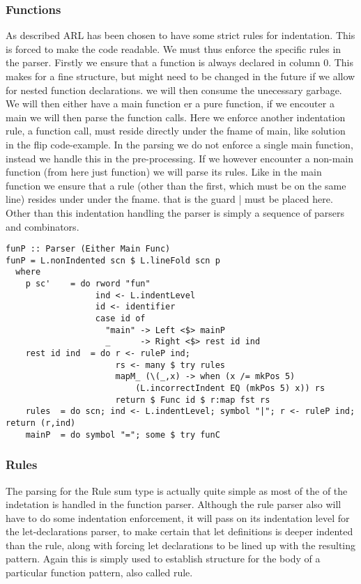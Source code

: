 \documentclass[a4paper]{article}
\begin{document}
\subsubsection{Functions}
\label{sec:orgbe40d3a}
As described ARL has been chosen to have some strict rules for indentation. This is forced to make the code readable. We must thus enforce the specific rules in the parser. Firstly we ensure that a function is always declared in column 0. This makes for a fine structure, but might need to be changed in the future if we allow for nested function declarations. we will then consume the unecessary garbage. We will then either have a main function er a pure function, if we encouter a main we will then parse the function calls. Here we enforce another indentation rule, a function call, must reside directly under the fname of main, like solution in the flip code-example. In the parsing we do not enforce a single main function, instead we handle this in the pre-processing.
If we however encounter a non-main function (from here just function) we will parse its rules. Like in the main function we ensure that a rule (other than the first, which must be on the same line) resides under under the fname. that is the guard | must be placed here. Other than this indentation handling the parser is simply a sequence of parsers and combinators.
\begin{verbatim}
funP :: Parser (Either Main Func)
funP = L.nonIndented scn $ L.lineFold scn p
  where
    p sc'    = do rword "fun"
                  ind <- L.indentLevel
                  id <- identifier
                  case id of
                    "main" -> Left <$> mainP
                    _      -> Right <$> rest id ind
    rest id ind  = do r <- ruleP ind;
                      rs <- many $ try rules
                      mapM_ (\(_,x) -> when (x /= mkPos 5)
                          (L.incorrectIndent EQ (mkPos 5) x)) rs
                      return $ Func id $ r:map fst rs
    rules  = do scn; ind <- L.indentLevel; symbol "|"; r <- ruleP ind; return (r,ind)
    mainP  = do symbol "="; some $ try funC
\end{verbatim}
\subsubsection{Rules}
\label{sec:org2e6f225}
The parsing for the Rule sum type is actually quite simple as most of the of the indetation is handled in the function parser. Although the rule parser also will have to do some indentation enforcement, it will pass on its indentation level for the let-declarations parser, to make certain that let definitions is deeper indented than the rule, along with forcing let declarations to be lined up with the resulting pattern. Again this is simply used to establish structure for the body of a particular function pattern, also called rule.
\end{document}
